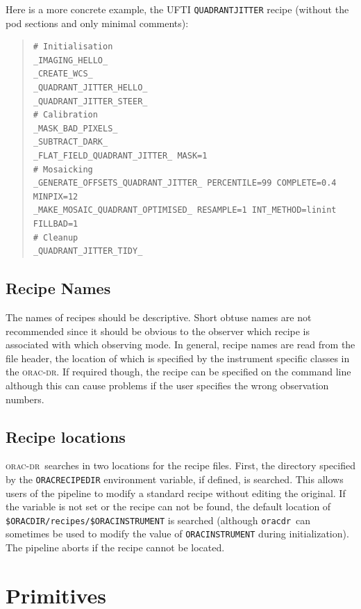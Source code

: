 \documentclass[twoside,11pt]{article}
\renewcommand{\_}{\texttt{\symbol{95}}}
\newcommand{\Oracdr}{\textsc{orac-dr}}
\newcommand{\oracdr}{\texttt{oracdr}}
\newenvironment{myquote}{\begin{quote}\begin{small}}{\end{small}\end{quote}}
\begin{document}
Here is a more concrete example, the UFTI \texttt{QUADRANT\_JITTER} recipe
(without the pod sections and only minimal comments):

\begin{myquote}
\begin{verbatim}
# Initialisation
_IMAGING_HELLO_
_CREATE_WCS_
_QUADRANT_JITTER_HELLO_
_QUADRANT_JITTER_STEER_
# Calibration
_MASK_BAD_PIXELS_
_SUBTRACT_DARK_
_FLAT_FIELD_QUADRANT_JITTER_ MASK=1
# Mosaicking
_GENERATE_OFFSETS_QUADRANT_JITTER_ PERCENTILE=99 COMPLETE=0.4 MINPIX=12
_MAKE_MOSAIC_QUADRANT_OPTIMISED_ RESAMPLE=1 INT_METHOD=linint FILLBAD=1
# Cleanup
_QUADRANT_JITTER_TIDY_
\end{verbatim}
\end{myquote}


\subsection{Recipe Names}

The names of recipes should be descriptive. Short obtuse names are not
recommended since it should be obvious to the observer which recipe is
associated with which observing mode. In general, recipe names are
read from the file header, the location of which is specified by the
instrument specific classes in the \Oracdr. If required though, the
recipe can be specified on the command line although this can cause
problems if the user specifies the wrong observation numbers.

\subsection{Recipe locations}

\Oracdr\ searches in two locations for the recipe files. First, the directory
specified by the \texttt{ORAC\_\-RECIPE\_DIR} environment variable, if
defined, is searched. This allows users of the pipeline to modify a standard
recipe without editing the original. If the variable is not set or the recipe
can not be found, the default location of
\texttt{\$ORAC\_DIR/recipes/\$ORAC\_INSTRUMENT} is searched (although
\oracdr\ can sometimes be used to modify the value of
\texttt{ORAC\_INSTRUMENT} during initialization). The pipeline aborts if the
recipe cannot be located.



\section{Primitives}
\end{document}
